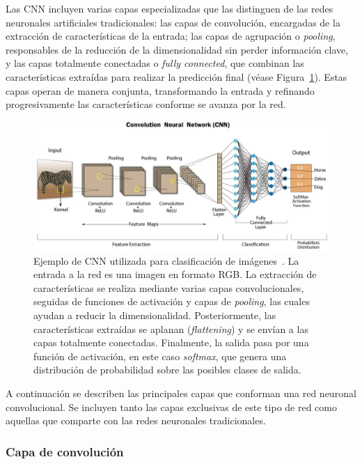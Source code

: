 Las CNN incluyen varias capas especializadas que las distinguen de las redes neuronales artificiales tradicionales: las capas de convolución, encargadas de la extracción de características de la entrada; las capas de agrupación o \emph{pooling}, responsables de la reducción de la dimensionalidad sin perder información clave, y las capas totalmente conectadas o \emph{fully connected}, que combinan las características extraídas para realizar la predicción final (véase Figura~\ref{fig:cnn}). Estas capas operan de manera conjunta, transformando la entrada y refinando progresivamente las características conforme se avanza por la red.

\begin{figure}[h]
    \centering
    \includegraphics[width=0.8\linewidth]{img/cnn.png}
    \caption[Ejemplo de CNN utilizada para clasificación de imágenes~\cite{CNNSwapna}.]{Ejemplo de CNN utilizada para clasificación de imágenes~\cite{CNNSwapna}. La entrada a la red es una imagen en formato RGB. La extracción de características se realiza mediante varias capas convolucionales, seguidas de funciones de activación y capas de \textit{pooling}, las cuales ayudan a reducir la dimensionalidad. Posteriormente, las características extraídas se aplanan (\textit{flattening}) y se envían a las capas totalmente conectadas. Finalmente, la salida pasa por una función de activación, en este caso \textit{softmax}, que genera una distribución de probabilidad sobre las posibles clases de salida.}\label{fig:cnn}
\end{figure}

A continuación se describen las principales capas que conforman una red neuronal convolucional. Se incluyen tanto las capas exclusivas de este tipo de red como aquellas que comparte con las redes neuronales tradicionales.


\subsubsection{Capa de convolución}


